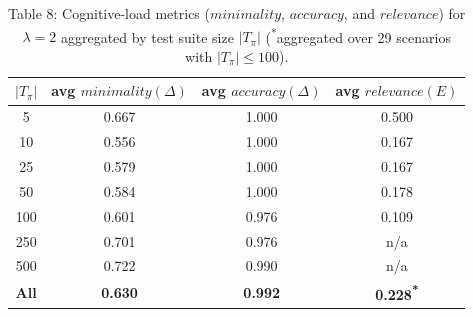 \begin{table}[htbp]
\centering
\scriptsize
\begin{tabular}{cccc}
\toprule
$|T_\pi|$ & avg $\mathit{minimality}(\Delta)$ & avg $\mathit{accuracy}(\Delta)$ & avg $\mathit{relevance}(E)$ \\
\midrule
5 & 0.667 & 1.000 & 0.500 \\
10 & 0.556 & 1.000 & 0.167 \\
25 & 0.579 & 1.000 & 0.167 \\
50 & 0.584 & 1.000 & 0.178 \\
100 & 0.601 & 0.976 & 0.109 \\
250 & 0.701 & 0.976 & n/a \\
500 & 0.722 & 0.990 & n/a \\
\midrule
\textbf{All} & \textbf{0.630} & \textbf{0.992} & \textbf{0.228\textsuperscript{*}} \\
\bottomrule
\end{tabular}
\caption{Table 8: Cognitive-load metrics ($\mathit{minimality}$, $\mathit{accuracy}$, and $\mathit{relevance}$) for $\lambda=2$ aggregated by test suite size $|T_\pi|$ (\textsuperscript{*}aggregated over 29 scenarios with $|T_\pi| \le 100$).}
\label{tab:table8}
\end{table}
